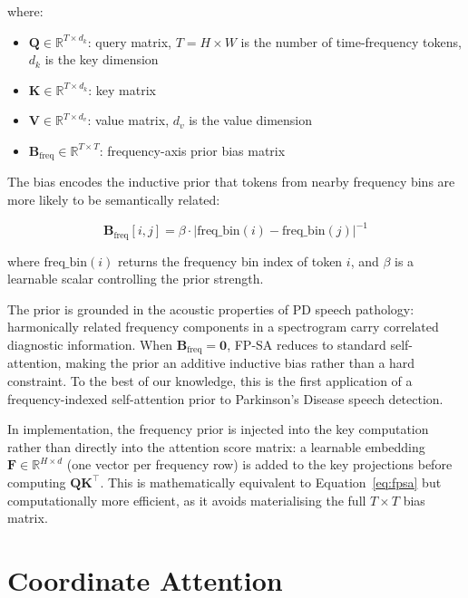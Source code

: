 \documentclass[oneside,openany]{final_report}
\begin{document}
\noindent where:

\begin{itemize}[nosep]
    \item $\mathbf{Q} \in \mathbb{R}^{T \times d_k}$: query matrix, $T = H \times W$ is the number of time-frequency tokens, $d_k$ is the key dimension
    \item $\mathbf{K} \in \mathbb{R}^{T \times d_k}$: key matrix
    \item $\mathbf{V} \in \mathbb{R}^{T \times d_v}$: value matrix, $d_v$ is the value dimension
    \item $\mathbf{B}_{\text{freq}} \in \mathbb{R}^{T \times T}$: frequency-axis prior bias matrix
\end{itemize}

The bias encodes the inductive prior that tokens from nearby frequency bins are more likely to be semantically related:

\begin{equation}
    \mathbf{B}_{\text{freq}}[i,j] = \beta \cdot |\text{freq\_bin}(i) - \text{freq\_bin}(j)|^{-1}
    \label{eq:freq_bias}
\end{equation}

\noindent where $\text{freq\_bin}(i)$ returns the frequency bin index of token $i$, and $\beta$ is a learnable scalar controlling the prior strength.

The prior is grounded in the acoustic properties of PD speech pathology: harmonically related frequency components in a spectrogram carry correlated diagnostic information. When $\mathbf{B}_{\text{freq}} = \mathbf{0}$, FP-SA reduces to standard self-attention, making the prior an additive inductive bias rather than a hard constraint. To the best of our knowledge, this is the first application of a frequency-indexed self-attention prior to Parkinson's Disease speech detection.

In implementation, the frequency prior is injected into the key computation rather than directly into the attention score matrix: a learnable embedding $\mathbf{F} \in \mathbb{R}^{H \times d}$ (one vector per frequency row) is added to the key projections before computing $\mathbf{Q}\mathbf{K}^\top$. This is mathematically equivalent to Equation~\ref{eq:fpsa} but computationally more efficient, as it avoids materialising the full $T \times T$ bias matrix.

\section{Coordinate Attention}
\end{document}
